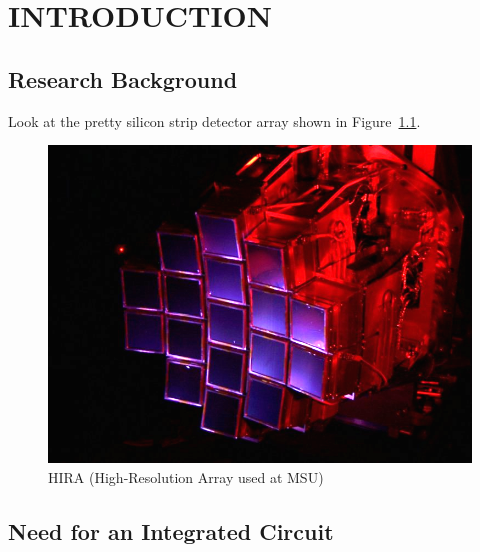 \documentclass[12pt,oneside,final]{siuethesis}
\theoremstyle{definition}
\begin{document}
\tableofcontents

\cleardoublepage %

\acknowledgements

\cleardoublepage

\listoffigures %

\cleardoublepage

\listoftables

\mainmatter %


\chapter{INTRODUCTION}  %



\section{Research Background}


Look at the pretty silicon strip detector array shown in Figure~\ref{FIG:HIRA_ARRAY}.

\begin{figure}[htbp!]
\centering
\includegraphics[scale=.6,keepaspectratio=true]{./ch1_figures/hira_array.png} 
\caption{HIRA (High-Resolution Array used at MSU)}
\label{FIG:HIRA_ARRAY}
\end{figure}



\section{Need for an Integrated Circuit}
\end{document}
